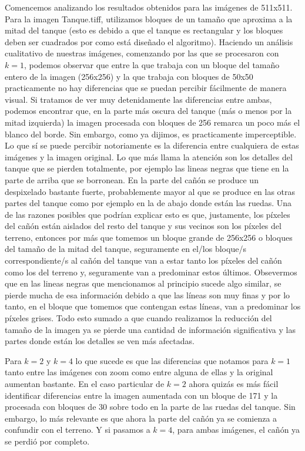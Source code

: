 \documentclass[a4paper]{article}
\begin{document}
Comencemos analizando los resultados obtenidos para las imágenes de 511x511. Para la imagen Tanque.tiff, utilizamos bloques de un tamaño que aproxima a la mitad del tanque (esto es debido a que el tanque es rectangular y los bloques deben ser cuadrados por como está diseñado el algoritmo). Haciendo un análisis cualitativo de nuestras imágenes, comenzando por las que se procesaron con $k = 1$, podemos observar que entre la que trabaja con un bloque del tamaño entero de la imagen (256x256) y la que trabaja con bloques de 50x50 practicamente no hay diferencias que se puedan percibir fácilmente de manera visual. Si tratamos de ver muy detenidamente las diferencias entre ambas, podemos encontrar que, en la parte más oscura del tanque (más o menos por la mitad izquierda) la imagen procesada con bloques de 256 remarca un poco más el blanco del borde. Sin embargo, como ya dijimos, es practicamente imperceptible. Lo que sí se puede percibir notoriamente es la diferencia entre cualquiera de estas imágenes y la imagen original. Lo que más llama la atención son los detalles del tanque que se pierden totalmente, por ejemplo las lineas negras que tiene en la parte de arriba que se borronean. En la parte del cañón se produce un despixelado bastante fuerte, probablemente mayor al que se produce en las otras partes del tanque como por ejemplo en la de abajo donde están las ruedas. Una de las razones posibles que podrían explicar esto es que, justamente, los píxeles del cañón están aislados del resto del tanque y sus vecinos son los píxeles del terreno, entonces por más que tomemos un bloque grande de 256x256 o bloques del tamaño de la mitad del tanque, seguramente en el/los bloque/s correspondiente/s al cañón del tanque van a estar tanto los píxeles del cañón como los del terreno y, seguramente van a predominar estos últimos. Obsevermos que en las lineas negras que mencionamos al principio sucede algo similar, se pierde mucha de esa información debido a que las líneas son muy finas y por lo tanto, en el bloque que tomemos que contengan estas líneas, van a predominar los píxeles grises. Todo esto sumado a que cuando realizamos la reducción del tamaño de la imagen ya se pierde una cantidad de información significativa y las partes donde están los detalles se ven más afectadas.
\par Para $k = 2$ y $k = 4$ lo que sucede es que las diferencias que notamos para $k = 1$ tanto entre las imágenes con zoom como entre alguna de ellas y la original aumentan bastante. En el caso particular de $k = 2$ ahora quizás es más fácil identificar diferencias entre la imagen aumentada con un bloque de 171 y la procesada con bloques de 30 sobre todo en la parte de las ruedas del tanque. Sin embargo, lo más relevante es que ahora la parte del cañón ya se comienza a confundir con el terreno. Y si pasamos a $k = 4$, para ambas imágenes, el cañón ya se perdió por completo.
\end{document}
